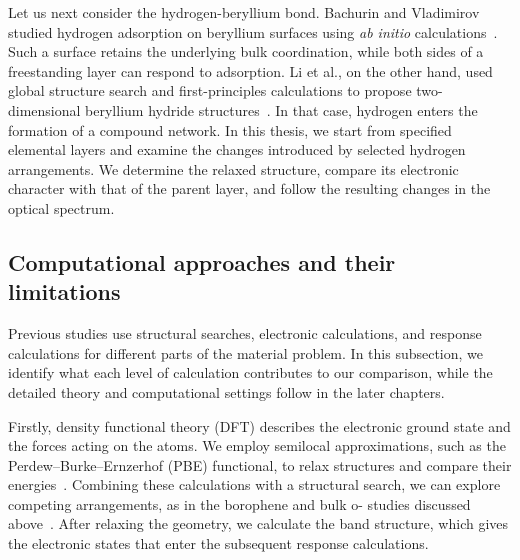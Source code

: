 Let us next consider the hydrogen-beryllium bond.
Bachurin and Vladimirov studied hydrogen adsorption on beryllium surfaces using \textit{ab initio} calculations~\cite{bachurin2015ab}.
Such a surface retains the underlying bulk coordination, while both sides of a freestanding layer can respond to adsorption.
Li et al., on the other hand, used global structure search and first-principles calculations to propose two-dimensional beryllium hydride structures~\cite{li2018global}.
In that case, hydrogen enters the formation of a compound network.
In this thesis, we start from specified elemental layers and examine the changes introduced by selected hydrogen arrangements.
We determine the relaxed structure, compare its electronic character with that of the parent layer, and follow the resulting changes in the optical spectrum.

\FloatBarrier
\subsection{Computational approaches and their limitations}
\label{subsec:lit_methods}

Previous studies use structural searches, electronic calculations, and response calculations for different parts of the material problem.
In this subsection, we identify what each level of calculation contributes to our comparison, while the detailed theory and computational settings follow in the later chapters.

Firstly, density functional theory (DFT) describes the electronic ground state and the forces acting on the atoms.
We employ semilocal approximations, such as the Perdew--Burke--Ernzerhof (PBE) functional, to relax structures and compare their energies~\cite{perdew1996generalized}.
Combining these calculations with a structural search, we can explore competing arrangements, as in the borophene and bulk o- studies discussed above~\cite{penev2012polymorphism,han2023superconducting}.
After relaxing the geometry, we calculate the band structure, which gives the electronic states that enter the subsequent response calculations.

